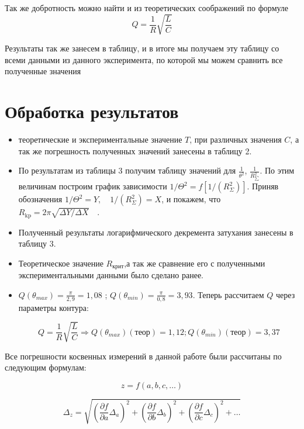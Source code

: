 \documentclass[a4paper, 12pt]{article}%
\begin{document}
Так же добротность можно найти и из теоретических соображений по формуле
\[Q = \dfrac{1}{R}\sqrt{\dfrac{L}{C}}\]

Результаты так же занесем в таблицу, и в итоге мы получаем эту таблицу со всеми данными из данного эксперимента, по которой мы можем сравнить все полученные значения

\section{Обработка результатов}

\begin{itemize}

\item теоретические и экспериментальные значение $T$, при различных значения $C$, а так же погрешность полученных значений занесены в таблицу 2.

\item По результатам из таблицы 3 получим таблицу значений для $\frac{1}{\theta^2}$, $\frac{1}{R_{\sum}^2}$. По этим величинам построим график зависимости $1 / \Theta^{2}=f\left[1 /\left(R_{\Sigma}^{2}\right)\right] .$ Приняв обозначения $1 / \Theta^{2}=Y, \quad 1 /\left(R_{\Sigma}^{2}\right)=X$, и покажем, что $R_{\mathrm{kp}}=2 \pi \sqrt{\Delta Y / \Delta X} \quad$.

\item Полученный результаты логарифмического декремента затухания занесены в таблицу 3.

\item Теоретическое значение $R_{\text{крит}}$,а так же сравнение его с полученными экспериментальными данными было сделано ранее. 

\item $Q(\theta_{max}) = \frac{\pi}{2,9} = 1,08$ ; $Q(\theta_{min}) = \frac{\pi}{0,8} = 3,93$. Теперь рассчитаем $Q$ через параметры контура: 

\[Q = \frac{1}{R} \sqrt{\frac{L}{C}} \Rightarrow  Q(\theta_{max})(\text{теор}) = 1, 12; Q(\theta_{min})(\text{теор}) = 3,37\] 

\end{itemize}

Все погрешности косвенных измерений в данной работе были рассчитаны по следующим формулам:

$$ z=f(a, b, c, \ldots) $$

$$ \Delta_{z}=\sqrt{\left(\frac{\partial f}{\partial a} \Delta_{a}\right)^{2}+\left(\frac{\partial f}{\partial b} \Delta_{b}\right)^{2}+\left(\frac{\partial f}{\partial c} \Delta_{c}\right)^{2}+\ldots} $$
\end{document}
